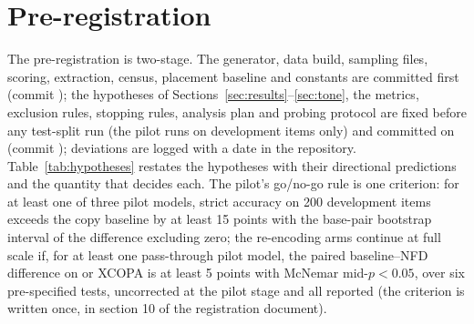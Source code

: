 

\section{Pre-registration}
\label{app:prereg}

The pre-registration is two-stage. The generator, data build, sampling files, scoring, extraction, census, placement baseline and constants are committed first (commit ); the hypotheses of Sections~\ref{sec:results}--\ref{sec:tone}, the metrics, exclusion rules, stopping rules, analysis plan and probing protocol are fixed before any test-split run (the pilot runs on development items only) and committed on  (commit ); deviations are logged with a date in the repository. Table~\ref{tab:hypotheses} restates the hypotheses with their directional predictions and the quantity that decides each. The pilot's go/no-go rule is one criterion: for at least one of three pilot models, strict  accuracy on 200 development items exceeds the copy baseline by at least 15 points with the base-pair bootstrap interval of the difference excluding zero; the re-encoding arms continue at full scale if, for at least one pass-through pilot model, the paired baseline--NFD difference on  or XCOPA is at least 5 points with McNemar mid-$p < 0.05$, over six pre-specified tests, uncorrected at the pilot stage and all reported (the criterion is written once, in section 10 of the registration document).

